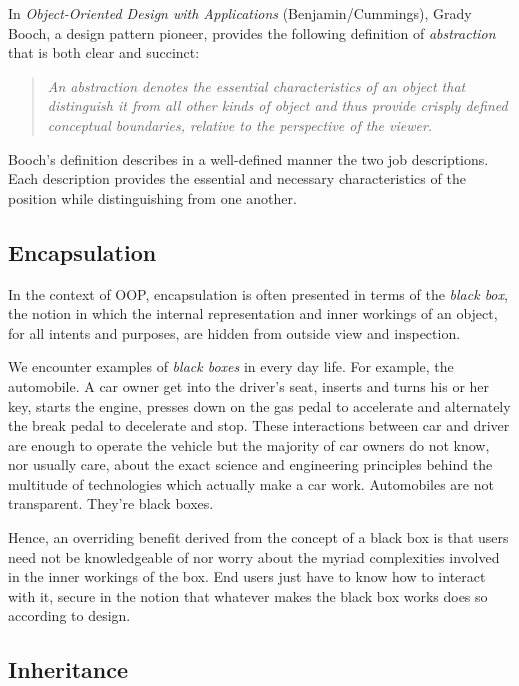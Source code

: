 \documentclass[12pt]{report}
\begin{document}
\begin{doublespace}
In \textit{Object-Oriented Design with Applications} (Benjamin/Cummings), Grady Booch, a design pattern pioneer, provides the following definition of \textit{abstraction} that is both clear and succinct:
\begin{quotation}
\textit{An abstraction denotes the essential characteristics of an object that distinguish it from all other kinds of object and thus provide crisply defined conceptual boundaries, relative to the perspective of the viewer.}
\end{quotation}

Booch's definition describes in a well-defined manner the two job descriptions. Each description provides the essential and necessary characteristics of the position while distinguishing from one another.
\end{doublespace}

\subsection{Encapsulation}

\begin{doublespace}
In the context of OOP, encapsulation is often presented in terms of the \textit{black box}, the notion in which the internal representation and inner workings of an object, for all intents and purposes, are hidden from outside view and inspection.

We encounter examples of \textit{black boxes} in every day life. For example, the automobile. A car owner get into the driver's seat, inserts and turns his or her key, starts the engine, presses down on the gas pedal to accelerate and alternately the break pedal to decelerate and stop. These interactions between car and driver are enough to operate the vehicle but the majority of car owners do not know, nor usually care, about the exact science and engineering principles behind the multitude of technologies which actually make a car work. Automobiles are not transparent. They're black boxes.

Hence, an overriding benefit derived from the concept of a black box is that users need not be knowledgeable of nor worry about the myriad complexities involved in the inner workings of the box. End users just have to know how to interact with it,
secure in the notion that whatever makes the black box works does so according to design. 
\end{doublespace}

\subsection{Inheritance}
\end{document}

